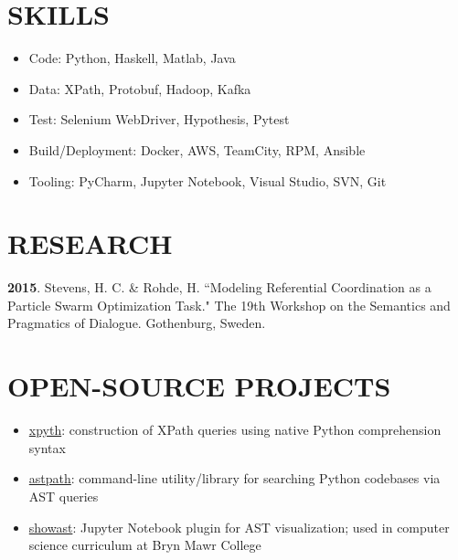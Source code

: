 \documentclass[line, margin]{res}
\begin{document}
\begin{resume}
\section{SKILLS}
\begin{itemize}[leftmargin=10pt]
\item Code: Python, Haskell, Matlab, Java
\item Data: XPath, Protobuf, Hadoop, Kafka
\item Test: Selenium WebDriver, Hypothesis, Pytest
\item Build/Deployment: Docker, AWS, TeamCity, RPM, Ansible
\item Tooling: PyCharm, Jupyter Notebook, Visual Studio, SVN, Git
\end{itemize}

\section{RESEARCH}
\textbf{2015}. Stevens, H. C. \& Rohde, H. ``Modeling Referential Coordination as a Particle Swarm Optimization Task." The 19th Workshop on the Semantics and Pragmatics of Dialogue. Gothenburg, Sweden.

\section{OPEN-SOURCE PROJECTS}
\begin{itemize}[leftmargin=10pt]
\item \href{https://github.com/hchasestevens/xpyth}{xpyth}: construction of XPath queries using native Python comprehension syntax
\item \href{https://github.com/hchasestevens/astpath}{astpath}: command-line utility/library for searching Python codebases via AST queries
\item \href{https://github.com/hchasestevens/show_ast}{showast}: Jupyter Notebook plugin for AST visualization; used in computer science curriculum at Bryn Mawr College
\end{itemize}


\end{resume}
\end{document}
